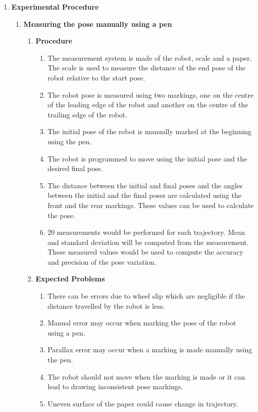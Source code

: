 \documentclass[10pt,a4paper]{article}
\begin{document}
\begin{enumerate}[label=\Roman*]
\vspace{0.5cm}
\item
\Large{\textbf{Experimental Procedure}}\\

\begin{enumerate}[label=\roman*)]

\item 
\Large{\textbf{Measuring the pose manually using a pen}}\\

\begin{enumerate}

\item
\Large{\textbf{Procedure}}\\

\begin{enumerate}
	\item
	The measurement system is made of the robot, scale and a paper. The scale is used to measure the distance of the end pose of the robot relative to the start pose. 
	\item
	The robot pose is measured using two markings, one on the centre of the leading edge of the robot and another on the centre of the trailing edge of the robot. 
	\item
	The initial pose of the robot is manually marked at the beginning using the pen.
	\item
	The robot is programmed to move using the initial pose and the desired final pose.
	\item
	The distance between the initial and final poses and the angles between the initial and the final poses are calculated using the front and the rear markings. These values can be used to calculate the pose.
	\item
	20 measurements would be performed for each trajectory. Mean and standard deviation will be computed from the measurement. These measured values would be used to compute the accuracy and precision of the pose variation. 
\end{enumerate}
\vspace{0.5cm}

\item
\textbf{Expected Problems}\\
\begin{enumerate}
	\item
	There can be errors due to wheel slip which are negligible if the distance travelled by the robot is less.
	\item
	Manual error may occur when marking the pose of the robot using a pen.
	\item 
	Parallax error may occur when a marking is made manually using the pen.
	\item
	The robot should not move when the marking is made or it can lead to drawing inconsistent pose markings. 
	\item
	Uneven surface of the paper could cause change in trajectory.
\end{enumerate}
\vspace{0.5cm}


\end{enumerate}
\end{enumerate}
\end{enumerate}
\end{document}
